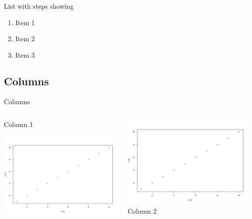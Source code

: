 \documentclass[
  ignorenonframetext,
  aspectratio=169]{beamer}
\providecommand{\tightlist}{%
  \setlength{\itemsep}{0pt}\setlength{\parskip}{0pt}}
\begin{document}
\begin{frame}{List with steps showing}
\protect\hypertarget{list-with-steps-showing}{}
\begin{enumerate}[<+->]
\tightlist
\item
  Item 1
\item
  Item 2
\item
  Item 3
\end{enumerate}
\end{frame}

\hypertarget{columns}{%
\subsection{Columns}\label{columns}}

\begin{frame}{Columns}
\begin{columns}[T]
\begin{column}{0.6\textwidth}
Column 1

\includegraphics[width=1\linewidth]{AUTTheme_Rmd_Beamer_demo_files/figure-beamer/unnamed-chunk-4-1}
\end{column}

\begin{column}{0.4\textwidth}
\includegraphics[width=1\linewidth]{AUTTheme_Rmd_Beamer_demo_files/figure-beamer/unnamed-chunk-5-1}
Column 2
\end{column}
\end{columns}
\end{frame}
\end{document}
